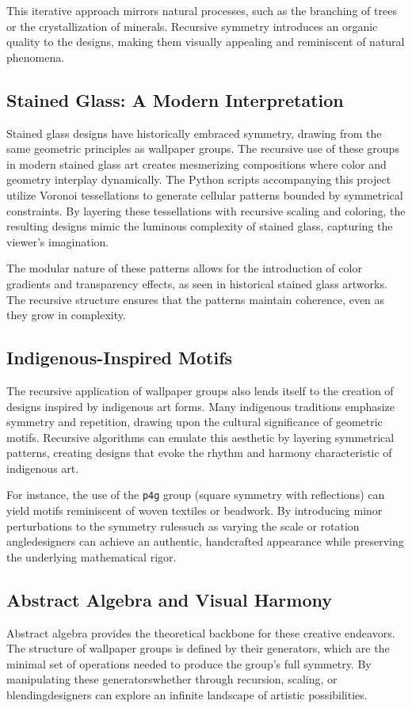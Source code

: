 This iterative approach mirrors natural processes, such as the branching of trees or the crystallization of minerals. Recursive symmetry introduces an organic quality to the designs, making them visually appealing and reminiscent of natural phenomena.

\subsection{Stained Glass: A Modern Interpretation}
Stained glass designs have historically embraced symmetry, drawing from the same geometric principles as wallpaper groups. The recursive use of these groups in modern stained glass art creates mesmerizing compositions where color and geometry interplay dynamically. The Python scripts accompanying this project utilize Voronoi tessellations to generate cellular patterns bounded by symmetrical constraints. By layering these tessellations with recursive scaling and coloring, the resulting designs mimic the luminous complexity of stained glass, capturing the viewer's imagination.

The modular nature of these patterns allows for the introduction of color gradients and transparency effects, as seen in historical stained glass artworks. The recursive structure ensures that the patterns maintain coherence, even as they grow in complexity.

\subsection{Indigenous-Inspired Motifs}
The recursive application of wallpaper groups also lends itself to the creation of designs inspired by indigenous art forms. Many indigenous traditions emphasize symmetry and repetition, drawing upon the cultural significance of geometric motifs. Recursive algorithms can emulate this aesthetic by layering symmetrical patterns, creating designs that evoke the rhythm and harmony characteristic of indigenous art.

For instance, the use of the \texttt{p4g} group (square symmetry with reflections) can yield motifs reminiscent of woven textiles or beadwork. By introducing minor perturbations to the symmetry rules\textemdash such as varying the scale or rotation angle\textemdash designers can achieve an authentic, handcrafted appearance while preserving the underlying mathematical rigor.

\subsection{Abstract Algebra and Visual Harmony}
Abstract algebra provides the theoretical backbone for these creative endeavors. The structure of wallpaper groups is defined by their generators, which are the minimal set of operations needed to produce the group's full symmetry. By manipulating these generators\textemdash whether through recursion, scaling, or blending\textemdash designers can explore an infinite landscape of artistic possibilities.

